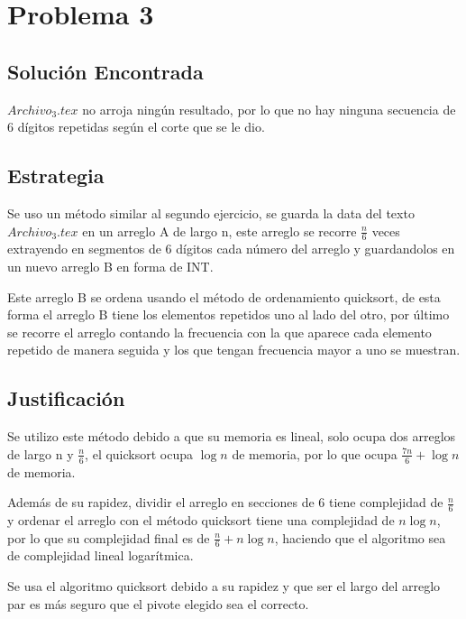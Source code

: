 \documentclass[10pt,letterpaper]{article}
\begin{document}
\newpage
\section{Problema 3}

\subsection{Solución Encontrada}

$Archivo_3.tex$ no arroja ningún resultado, por lo que no hay ninguna secuencia de 6 dígitos repetidas según el corte que se le dio.

\subsection{Estrategia}


Se uso un método similar al segundo ejercicio, se guarda la data del texto $Archivo_3.tex$ en un arreglo A de largo n, este arreglo se recorre $\frac{n}{6}$ veces extrayendo en segmentos de 6 dígitos cada número del arreglo y guardandolos en un nuevo arreglo B en forma de INT.

Este arreglo B se ordena usando el método de ordenamiento quicksort, de esta forma el arreglo B tiene los elementos repetidos uno al lado del otro, por último se recorre el arreglo contando la frecuencia con la que aparece cada elemento repetido de manera seguida y los que tengan frecuencia mayor a uno se muestran.


\subsection{Justificación}

Se utilizo este método debido a que su memoria es lineal, solo ocupa dos arreglos de largo n y $\frac{n}{6}$, el quicksort ocupa $\log n$ de memoria, por lo que ocupa $\frac{7n}{6} + \log n$ de memoria.

Además de su rapidez, dividir el arreglo en secciones de 6 tiene complejidad de $\frac{n}{6}$ y ordenar el arreglo con el método quicksort tiene una complejidad de $n \log n $, por lo que su complejidad final es de $\frac{n}{6} + n \log n $, haciendo que el algoritmo sea de complejidad lineal logarítmica.

Se usa el algoritmo quicksort debido a su rapidez y que ser el largo del arreglo par es más seguro que el pivote elegido sea el correcto.
\end{document}
